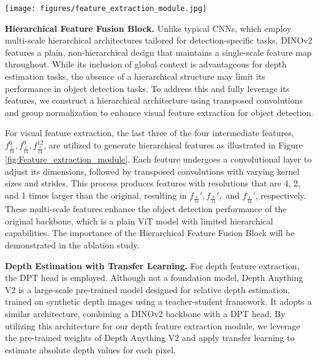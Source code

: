 \begin{figure*}[h]
    \centering
    \texttt{[image: figures/feature\_extraction\_module.jpg]}
    \caption[Overall Structure of Feature Extraction Module]{\textbf{Overall Structure of Feature Extraction Module.} The Feature Extraction Module is divided into three components: the DINOv2 backbone, the Visual Feature Extraction Module, and the Depth Feature Extraction Module. The \textbf{Hierarchical Feature Fusion Block} serves as the key module for visual features, while the combination of the DPT Head and DINOv2, which together form the \textbf{Depth Anything V2} architecture, serves as the key module for depth features.
    } \label{fig:Feature_extraction_module}
\end{figure*}

\textbf{Hierarchical Feature Fusion Block.} Unlike typical CNNs, which employ multi-scale hierarchical architectures tailored for detection-specific tasks, DINOv2 features a plain, non-hierarchical design that maintains a single-scale feature map throughout. While its inclusion of global context is advantageous for depth estimation tasks, the absence of a hierarchical structure may limit its performance in object detection tasks. To address this and fully leverage its features, we construct a hierarchical architecture using transposed convolutions and group normalization to enhance visual feature extraction for object detection.

For visual feature extraction, the last three of the four intermediate features, $f_{\frac{1}{14}}^6, f_{\frac{1}{14}}^9, f_{\frac{1}{14}}^{12}$, are utilized to generate hierarchical features as illustrated in Figure \ref{fig:Feature_extraction_module}. Each feature undergoes a convolutional layer to adjust its dimensions, followed by transposed convolutions with varying kernel sizes and strides. This process produces features with resolutions that are 4, 2, and 1 times larger than the original, resulting in $f_{\frac{4}{14}}', f_{\frac{2}{14}}',$ and $f_{\frac{1}{14}}'$, respectively.
These multi-scale features enhance the object detection performance of the original backbone, which is a plain ViT model with limited hierarchical capabilities. The importance of the Hierarchical Feature Fusion Block will be demonstrated in the ablation study.

\textbf{Depth Estimation with Transfer Learning.} For depth feature extraction, the DPT \cite{ranftl2021vision} head is employed. Although not a foundation model, Depth Anything V2 \cite{yang2024depth} is a large-scale pre-trained model designed for relative depth estimation, trained on synthetic depth images using a teacher-student framework. It adopts a similar architecture, combining a DINOv2 backbone with a DPT head.
By utilizing this architecture for our depth feature extraction module, we leverage the pre-trained weights of Depth Anything V2 and apply transfer learning to estimate absolute depth values for each pixel.

